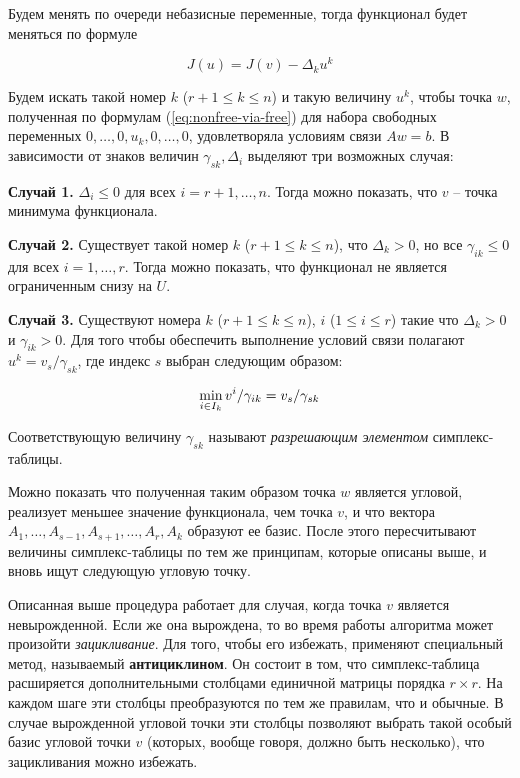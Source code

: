 \documentclass[a4paper, 12pt, titlepage]{article}
\theoremstyle{definition}
\theoremstyle{plain}
\theoremstyle{plain}
\begin{document}
Будем менять по очереди небазисные переменные, тогда функционал будет меняться
по формуле

\begin{equation}
 J(u) = J(v) - \Delta_{k} u^{k}
\end{equation}

Будем искать такой номер $k$ ($r + 1 \leq k \leq n$) и такую величину $u^{k}$,
чтобы точка $w$, полученная по формулам (\ref{eq:nonfree-via-free}) для набора
свободных переменных $0, \ldots, 0, u_{k}, 0, \ldots, 0$, удовлетворяла
условиям связи $A w = b$. В зависимости от знаков величин $\gamma_{s k},
\Delta_{i}$ выделяют три возможных случая:

\textbf{Случай 1.} $\Delta_{i} \leq 0$ для всех $i = r + 1, \ldots, n$. Тогда 
можно показать, что $v$ -- точка минимума функционала.

\textbf{Случай 2.} Существует такой номер $k$ ($r + 1 \leq k \leq n$), что 
$\Delta_{k} > 0$, но все $\gamma_{i k} \leq 0$ для всех $i = 1, \ldots, r$.
Тогда можно показать, что функционал не является ограниченным снизу на $U$.

\textbf{Случай 3.} Существуют номера $k$ ($r + 1 \leq k \leq n$),
$i$ ($1 \leq i \leq r$) такие что $\Delta_{k} > 0$ и $\gamma_{i k} > 0$.
Для того чтобы обеспечить выполнение условий связи полагают
$u^{k} = v_{s} / \gamma_{s k}$, где индекс $s$ выбран следующим образом:

\begin{equation}
 \operatornamewithlimits{min}_{i \in I_{k}} v^{i} / \gamma_{i k} =
 v_{s} / \gamma_{s k}
\end{equation}

Соответствующую величину $\gamma_{s k}$ называют \textit{разрешающим элементом}
симплекс-таблицы.

Можно показать что полученная таким образом точка $w$ является угловой, 
реализует меньшее значение функционала, чем точка $v$, и что вектора
$A_{1}, \ldots, A_{s - 1}, A_{s + 1}, \ldots, A_{r}, A_{k}$ образуют ее базис.
После этого пересчитывают величины симплекс-таблицы по тем же принципам,
которые описаны выше, и вновь ищут следующую угловую точку.

Описанная выше процедура работает для случая, когда точка $v$ является
невырожденной. Если же она вырождена, то во время работы алгоритма может
произойти \textit{зацикливание}. Для того, чтобы его избежать, применяют
специальный метод, называемый \textbf{антициклином}. Он состоит в том, что
симплекс-таблица расширяется дополнительными столбцами единичной матрицы
порядка $r \times r$. На каждом шаге эти столбцы преобразуются по тем же
правилам, что и обычные. В случае вырожденной угловой точки эти столбцы
позволяют выбрать такой особый базис угловой точки $v$ (которых, вообще говоря,
должно быть несколько), что зацикливания можно избежать.
\end{document}
